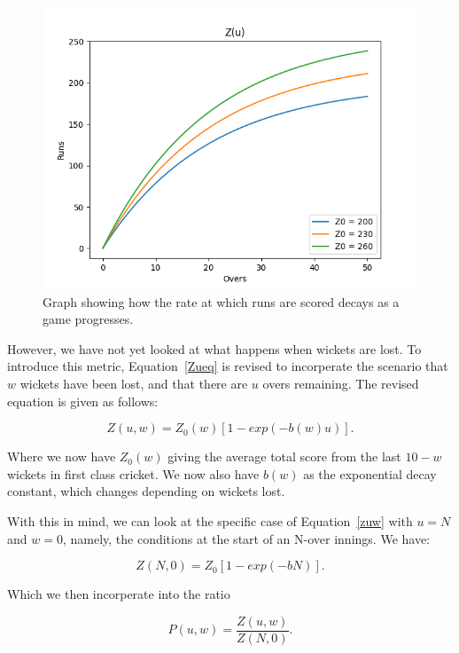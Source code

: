 \begin{figure}[h]
    \centering
    \includegraphics[scale=0.6]{figures/z(u).png}
    \caption{Graph showing how the rate at which runs are scored decays as a game progresses.}
    \label{Zugraph}
\end{figure}

However, we have not yet looked at what happens when wickets are lost. To introduce this metric, Equation~\ref{Zueq}
is revised to incorperate the scenario that $w$ wickets have been lost, and that there are $u$ overs remaining.
The revised equation is given as follows:

\begin{equation}
    Z(u,w) = Z_0(w)[1-exp(-b(w)u)].
    \label{zuw}
\end{equation}

Where we now have $Z_0(w)$ giving the average total score from the last $10-w$ wickets in first class cricket.
We now also have $b(w)$ as the exponential decay constant, which changes depending on wickets lost.

With this in mind, we can look at the specific case of Equation~\ref{zuw} with $u=N$ and $w=0$, namely, the conditions
at the start of an N-over innings. We have:

\begin{equation}
    Z(N,0) = Z_0[1-exp(-bN)].
    \label{zstart}
\end{equation}

Which we then incorperate into the ratio

\begin{equation}
    P(u,w) = \frac{Z(u,w)}{Z(N,0)}.
    \label{prat}
\end{equation}

